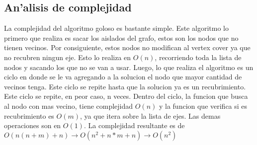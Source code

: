 \subsection{An'alisis de complejidad}
La complejidad del algoritmo goloso es bastante simple. Este algoritmo lo primero que realiza es sacar los aislados del grafo, estos son los nodos que no tienen vecinos.
Por consiguiente, estos nodos no modifican al vertex cover ya que no recubren ningun eje.
Esto lo realiza en $O(n)$, recorriendo toda la lista de nodos y sacando los que no se van a usar.
Luego, lo que realiza el algoritmo es un ciclo en donde se le va agregando a la solucion el nodo que mayor cantidad de vecinos tenga. Este ciclo se repite
hasta que la solucion ya es un recubrimiento. Este ciclo se repite, en peor caso, n veces. Dentro del ciclo, la funcion que busca al nodo con mas vecino, tiene complejidad $O(n)$ y la funcion que verifica si es recubrimiento es $O(m)$, ya que itera sobre la lista de ejes.
Las demas operaciones son en $O(1)$. 
La complejidad resultante es de $O(n(n+m)+n) \rightarrow O(n^2+n*m+n) \rightarrow O(n^2)$ 

